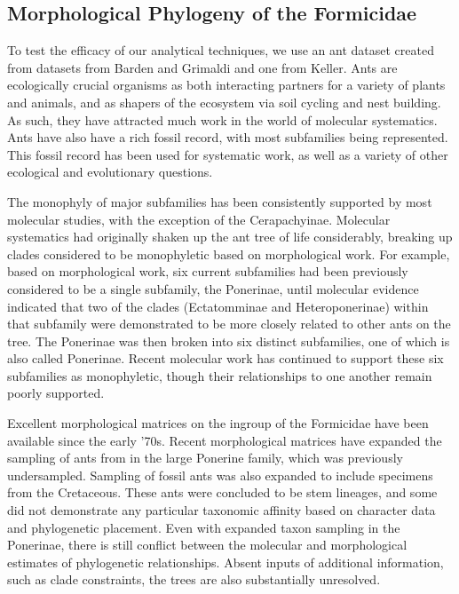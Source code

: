 \documentclass[]{sysbio}
\begin{document}
\subsection{Morphological Phylogeny of the Formicidae}

To test the efficacy of our analytical techniques, we use an ant dataset created from datasets from Barden and Grimaldi and one from Keller.
Ants are ecologically crucial organisms as both interacting partners for a variety of plants and animals, and as shapers of the ecosystem via soil cycling and nest building.
As such, they have attracted much work in the world of molecular systematics.
Ants have also have a rich fossil record, with most subfamilies being represented. 
This fossil record has been used for systematic work, as well as a variety of other ecological and evolutionary questions.\par
The monophyly of major subfamilies has been consistently supported by most molecular studies, with the exception of the Cerapachyinae. 
Molecular systematics had originally shaken up the ant tree of life considerably, breaking up clades considered to be monophyletic based on morphological work.
For example, based on morphological work, six current subfamilies had been previously considered to be a single subfamily, the Ponerinae, until molecular evidence indicated that two of the clades (Ectatomminae and Heteroponerinae) within that subfamily were demonstrated to be more closely related to other ants on the tree.
The Ponerinae was then broken into six distinct subfamilies, one of which is also called Ponerinae. 
Recent molecular work has continued to support these six subfamilies as monophyletic, though their relationships to one another remain poorly supported. \par
Excellent morphological matrices on the ingroup of the Formicidae have been available since the early '70s. 
Recent morphological matrices have expanded the sampling of ants from in the large Ponerine family, which was previously undersampled.
Sampling of fossil ants was also expanded to include specimens from the Cretaceous.
These ants were concluded to be stem lineages, and some did not demonstrate any particular taxonomic affinity based on character data and phylogenetic placement. 
Even with expanded taxon sampling in the Ponerinae, there is still conflict between the molecular and morphological estimates of phylogenetic relationships. 
Absent inputs of additional information, such as clade constraints, the trees are also substantially unresolved. \par
\end{document}
